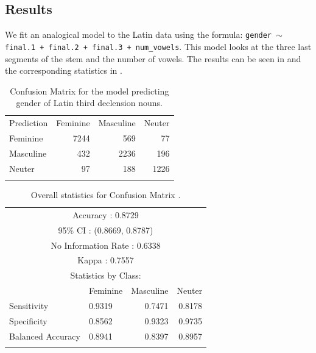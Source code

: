 \subsection{Results}

We fit an analogical model to the Latin data using the formula: \texttt{gender $\sim$ final.1\- + final.2 + final.3 + num\_vowels}. This model looks at the three last segments of the stem and the number of vowels. The results can be seen in  and the corresponding statistics in .

\begin{table}[!htpb]
  \centering
  \begin{tabular}{lrrr}
    \lsptoprule
    \multicolumn{4}{c}{Reference}                  \\
    \midrule
    Prediction     & Feminine & Masculine & Neuter \\
         Feminine  & 7244     & 569       & 77     \\
         Masculine & 432      & 2236      & 196    \\
         Neuter    & 97       & 188       & 1226   \\
    \lspbottomrule
  \end{tabular}
  \caption{Confusion Matrix for the model predicting gender of Latin third declension nouns.}\label{tab:gender-lat}
\end{table}

\begin{table}[!htpb]
  \centering
  \begin{tabular}{llrr}
    \lsptoprule
    \multicolumn{4}{c}{Overall statistics:} \\

    \midrule
    \multicolumn{4}{c}{Accuracy : 0.8729}             \\
    \multicolumn{4}{c}{95\% CI : (0.8669, 0.8787)}    \\
    \multicolumn{4}{c}{No Information Rate : 0.6338}  \\
    \multicolumn{4}{c}{Kappa : 0.7557}                \\
    \midrule
    \multicolumn{4}{c}{Statistics by Class:}          \\
    \midrule
                      & Feminine & Masculine & Neuter \\
    Sensitivity       & 0.9319   & 0.7471    & 0.8178 \\
    Specificity       & 0.8562   & 0.9323    & 0.9735 \\
    Balanced Accuracy & 0.8941   & 0.8397    & 0.8957 \\
    \lspbottomrule
  \end{tabular}
  \caption{Overall statistics for Confusion Matrix .}\label{tab:gender-lat-stats}
\end{table}

